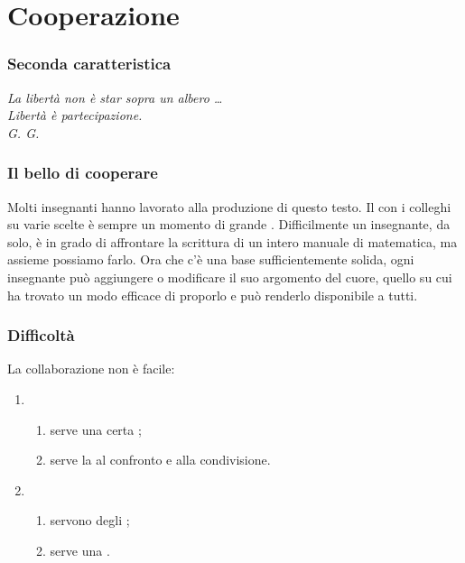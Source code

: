 \documentclass{beamer} %
\begin{document}
\section{Cooperazione}


\begin{frame}\frametitle{Seconda caratteristica}

\begin{center}  \end{center}

\vspace{20mm}
\begin{flushright}
\emph{La libertà non è star sopra un albero \dots\\
Libertà è partecipazione.\\
G. G.}
\end{flushright}

\end{frame}


\begin{frame}\frametitle{Il bello di cooperare}

Molti insegnanti hanno lavorato alla produzione di questo testo.
\spause
Il  con i colleghi su varie scelte è sempre un momento di 
grande .
\spause
Difficilmente un insegnante, da solo, è in grado di affrontare la scrittura 
di un intero manuale di matematica, ma assieme possiamo farlo.
\spause
Ora che c'è una base sufficientemente solida, ogni insegnante 
può aggiungere o modificare il suo argomento del cuore, quello su cui ha 
trovato un modo efficace di proporlo e può renderlo disponibile a tutti.

\end{frame}


\begin{frame}\frametitle{Difficoltà}

La collaborazione non è facile:
\begin{enumerate} [<+->]
\item {}
\begin{enumerate}
\item serve una certa ;
\item serve la  al confronto e alla condivisione.
\end{enumerate}
\item {}
\begin{enumerate}
\item servono degli ;
\item serve una .
\end{enumerate}
\end{enumerate}

\end{frame}
\end{document}
